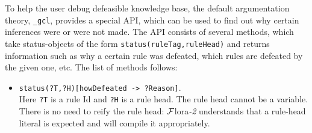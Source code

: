 \documentclass[11pt]{article}
\newcommand{\FLORA}{{\mbox{\sc ${\cal F}${lora}\rm\emph{-2}}}\xspace}
\begin{document}
To help the user debug defeasible knowledge base, the default argumentation
theory, {\tt \_gcl}, provides a special API, which can be used to find out
why certain inferences were or were not made.
The API consists of several methods, which take status-objects of the form
{\tt status(ruleTag,ruleHead)} and returns information such as why a certain
rule was defeated, which rules are defeated by the given one, etc.
The list of methods follows:
\begin{itemize}
\item  {\tt status(?T,?H)[howDefeated -> ?Reason]}.\\
  Here {\tt ?T} is a rule Id and {\tt ?H} is a rule head. The rule head
  cannot be a variable. There is no need to reify the rule head: \FLORA
  understands that a rule-head literal is expected and will compile it
  appropriately.  


\end{itemize}
\end{document}
